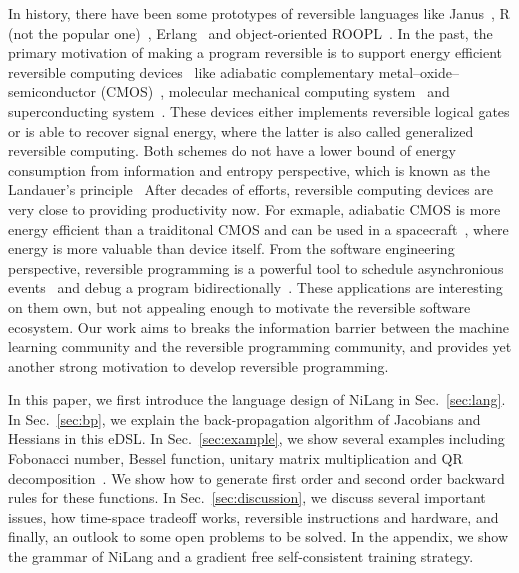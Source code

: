 \documentclass[aps,twocolumn,longbibliography,english,superscriptaddress]{revtex4-1}
\newcommand{\<}{\langle}
\renewcommand{\>}{\rangle}
\newcommand{\Sec}[1]{Sec.~\ref{#1}}
\theoremstyle{definition}\newtheorem{definition}{\textit{Definition}}
\begin{document}
    In history, there have been some prototypes of reversible languages like Janus~\cite{Lutz1986}, R (not the popular one)~\cite{Frank1997}, Erlang~\cite{Lanese2018} and object-oriented ROOPL~\cite{Haulund2017}. %
    In the past, the primary motivation of making a program reversible is to support energy efficient reversible computing devices~\cite{Frank1999} like adiabatic complementary metal–oxide–semiconductor (CMOS)~\cite{Koller1992}, molecular mechanical computing system~\cite{Merkle2018} and superconducting system~\cite{Likharev1977,Semenov2003}. These devices either implements reversible logical gates or is able to recover signal energy, where the latter is also called generalized reversible computing. Both schemes do not have a lower bound of energy consumption from information and entropy perspective, which is known as the Landauer's principle~\cite{Landauer1961}
    After decades of efforts, reversible computing devices are very close to providing productivity now. For exmaple, adiabatic CMOS is more energy efficient than a traiditonal CMOS and can be used in a spacecraft~\cite{Debenedictis2017}, where energy is more valuable than device itself.
    From the software engineering perspective, reversible programming is a powerful tool to schedule asynchronious events~\cite{Jefferson1985} and debug a program bidirectionally~\cite{Boothe2000}.
    These applications are interesting on them own, but not appealing enough to motivate the reversible software ecosystem.
    Our work aims to breaks the information barrier between the machine learning community and the reversible programming community, and provides yet another strong motivation to develop reversible programming.

    In this paper, we first introduce the language design of NiLang in \Sec{sec:lang}.
    In \Sec{sec:bp}, we explain the back-propagation algorithm of Jacobians and Hessians in this eDSL.
    In \Sec{sec:example}, we show several examples including Fobonacci number, Bessel function, unitary matrix multiplication and QR decomposition~\cite{Golub2012}. We show how to generate first order and second order backward rules for these functions.
    In \Sec{sec:discussion}, we discuss several important issues, how time-space tradeoff works, reversible instructions and hardware, and finally, an outlook to some open problems to be solved.
    In the appendix, we show the grammar of NiLang and a gradient free self-consistent training strategy.
\end{document}
